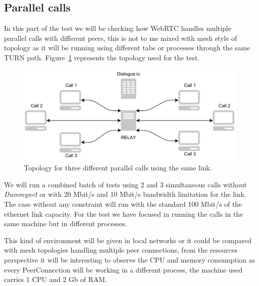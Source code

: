 \subsection{Parallel calls}

In this part of the test we will be checking how WebRTC handles multiple parallel calls with different peers, this is not to me mixed with mesh style of topology as it will be running using different tabs or processes through the same TURN path. Figure~\ref{fig:parallelCalls} represents the topology used for the test.

 \begin{figure}[h]
  \centering
    \includegraphics[width=1\textwidth]{./figures/ParallelCalls.pdf}
      \caption[Topology for three different parallel calls using the same link]{Topology for three different parallel calls using the same link.}
	\label{fig:parallelCalls}
\end{figure}

We will run a combined batch of tests using 2 and 3 simultaneous calls without {\it Dummynet} or with 20 Mbit/s and 10 Mbit/s bandwidth limitation for the link. The case without any constraint will run with the standard 100 Mbit/s of the ethernet link capacity. For the test we have focused in running the calls in the same machine but in different processes.

This kind of environment will be given in local networks or it could be compared with mesh topologies handling multiple peer connections, from the resources perspective it will be interesting to observe the CPU and memory consumption as every PeerConnection will be working in a different process, the machine used carries 1 CPU and 2 Gb of RAM.

